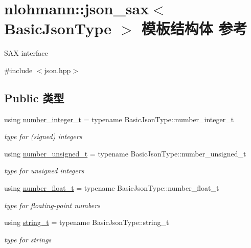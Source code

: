 \hypertarget{structnlohmann_1_1json__sax}{}\section{nlohmann\+::json\+\_\+sax$<$ Basic\+Json\+Type $>$ 模板结构体 参考}
\label{structnlohmann_1_1json__sax}


S\+AX interface  




{\ttfamily \#include $<$json.\+hpp$>$}

\subsection*{Public 类型}
\begin{DoxyCompactItemize}
\item 
\mbox{\label{structnlohmann_1_1json__sax_a0cef30121f02b7fee85e9708148ea0aa}} 
using \mbox{\hyperlink{structnlohmann_1_1json__sax_a0cef30121f02b7fee85e9708148ea0aa}{number\+\_\+integer\+\_\+t}} = typename Basic\+Json\+Type\+::number\+\_\+integer\+\_\+t
\begin{DoxyCompactList}\small\item\em type for (signed) integers \end{DoxyCompactList}\item 
\mbox{\label{structnlohmann_1_1json__sax_a32028cc056ae0f43aaae331cdbbbf856}} 
using \mbox{\hyperlink{structnlohmann_1_1json__sax_a32028cc056ae0f43aaae331cdbbbf856}{number\+\_\+unsigned\+\_\+t}} = typename Basic\+Json\+Type\+::number\+\_\+unsigned\+\_\+t
\begin{DoxyCompactList}\small\item\em type for unsigned integers \end{DoxyCompactList}\item 
\mbox{\label{structnlohmann_1_1json__sax_a390c209bffd8c4800c8f3076dc465a20}} 
using \mbox{\hyperlink{structnlohmann_1_1json__sax_a390c209bffd8c4800c8f3076dc465a20}{number\+\_\+float\+\_\+t}} = typename Basic\+Json\+Type\+::number\+\_\+float\+\_\+t
\begin{DoxyCompactList}\small\item\em type for floating-\/point numbers \end{DoxyCompactList}\item 
\mbox{\label{structnlohmann_1_1json__sax_ae01977a9f3c5b3667b7a2929ed91061e}} 
using \mbox{\hyperlink{structnlohmann_1_1json__sax_ae01977a9f3c5b3667b7a2929ed91061e}{string\+\_\+t}} = typename Basic\+Json\+Type\+::string\+\_\+t
\begin{DoxyCompactList}\small\item\em type for strings \end{DoxyCompactList}\end{DoxyCompactItemize}
